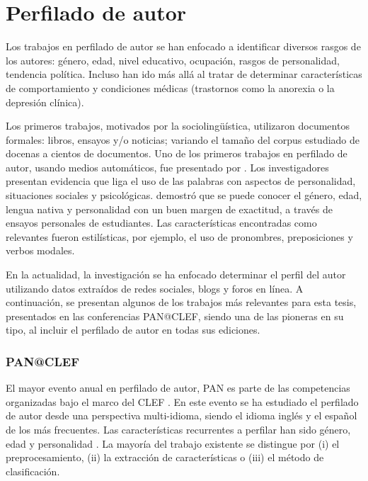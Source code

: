 \section{Perfilado de autor}
Los trabajos en perfilado de autor se han enfocado a identificar diversos rasgos de los autores: género, edad, nivel educativo, ocupación, rasgos de personalidad, tendencia política. Incluso han ido más allá al tratar de determinar características de comportamiento y condiciones médicas (trastornos como la anorexia o la depresión clínica). 

Los primeros trabajos, motivados por la sociolingüística, utilizaron documentos formales: libros, ensayos y/o noticias; variando el tamaño del corpus estudiado de docenas a cientos de documentos. 
Uno de los primeros trabajos en perfilado de autor, usando medios automáticos, fue presentado por \citep{Pennebaker2002}. Los investigadores presentan evidencia que liga el uso de las palabras con aspectos de personalidad, situaciones sociales y psicológicas. \citep{Argamon2009} demostró que se puede conocer el género, edad, lengua nativa y personalidad con un buen margen de exactitud, a través de ensayos personales de estudiantes. Las características encontradas como relevantes fueron estilísticas, por ejemplo, el uso de pronombres, preposiciones y verbos modales. 

En la actualidad, la investigación se ha enfocado determinar el perfil del autor utilizando datos extraídos de redes sociales, blogs y foros en línea. A continuación, se presentan algunos de los trabajos más relevantes para esta tesis, presentados en las conferencias PAN@CLEF, siendo una de las pioneras en su tipo, al incluir el perfilado de autor en todas sus ediciones.

\subsubsection{PAN@CLEF}
El mayor evento anual en perfilado de autor, PAN es parte de las competencias organizadas bajo el marco del CLEF \citep{Rangel2013b, Rangel2019}. En este evento se ha estudiado el perfilado de autor desde una perspectiva multi-idioma, siendo el idioma inglés y el español de los más frecuentes. Las características recurrentes a perfilar han sido género, edad y personalidad  \citep{Rangel2013b, Rangel2019, Rangel2016b, Stammatatos2015}.
La mayoría del trabajo existente se distingue por (i) el preprocesamiento, (ii) la extracción de características o (iii) el método de clasificación.


